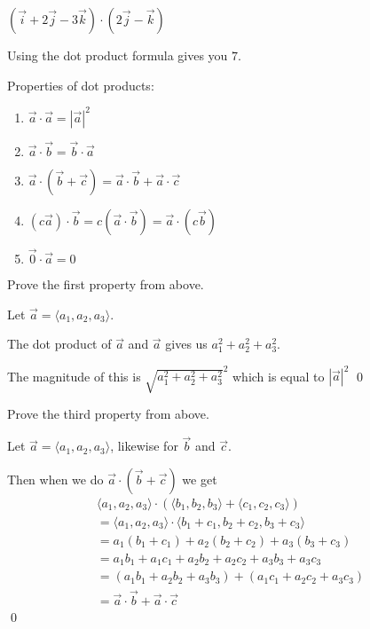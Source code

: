 \documentclass[../calc3.tex]{subfiles}
\begin{document}
\begin{example}
    $(\vec{i}+2\vec{j}-3\vec{k})\cdot (2\vec{j}-\vec{k})$

    Using the dot product formula gives you $7$.
\end{example}

Properties of dot products:
\begin{enumerate}
    \item $\vec{a}\cdot \vec{a} = |\vec{a}|^2$
    \item $\vec{a}\cdot \vec{b} = \vec{b}\cdot \vec{a}$
    \item $\vec{a}\cdot (\vec{b}+\vec{c})=\vec{a}\cdot \vec{b}+\vec{a}\cdot \vec{c}$
    \item $(c\vec{a})\cdot \vec{b}=c(\vec{a}\cdot \vec{b})=\vec{a}\cdot (c\vec{b})$
    \item $\vec{0}\cdot \vec{a}=0$
\end{enumerate}

\begin{example}
    Prove the first property from above.

    Let $\vec{a}=\langle a_1,a_2,a_3\rangle$.

    The dot product of $\vec{a}$ and $\vec{a}$ gives us $a_1^2+a_2^2+a_3^2$.

    The magnitude of this is $\sqrt{a_1^2+a_2^2+a_3^2}^2$ which is equal to $|\vec{a}|^2$ \qed
\end{example}

\begin{example}
    Prove the third property from above.

    Let $\vec{a}=\langle a_1,a_2,a_3\rangle$, likewise for $\vec{b}$ and $\vec{c}$.

    Then when we do $\vec{a}\cdot (\vec{b}+\vec{c})$ we get 
    \begin{align*}
        \langle a_1,a_2,a_3\rangle \cdot (\langle b_1,b_2,b_3\rangle + \langle c_1,c_2,c_3\rangle)\\
        = \langle a_1,a_2,a_3\rangle \cdot \langle b_1+c_1, b_2+c_2, b_3+c_3\rangle\\
        = a_1(b_1+c_1)+a_2(b_2+c_2)+a_3(b_3+c_3)\\
        = a_1b_1+a_1c_1+a_2b_2+a_2c_2+a_3b_3+a_3c_3\\
        = (a_1b_1+a_2b_2+a_3b_3)+(a_1c_1+a_2c_2+a_3c_3)\\
        = \vec{a}\cdot \vec{b}+\vec{a}\cdot \vec{c} 
    \end{align*}\qed 
\end{example}
\end{document}
